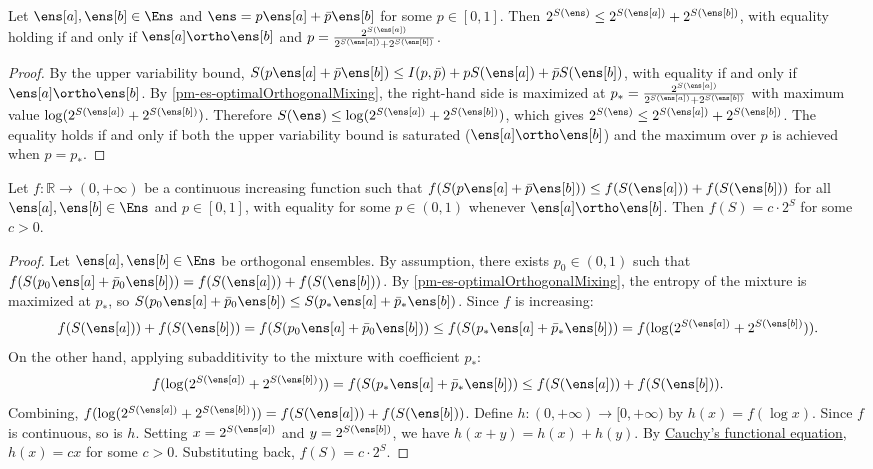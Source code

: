 \begin{mathSection}
	\begin{prop}\label{pm-es-exponentialEntropySubadditivity}
		Let $\ens[a], \ens[b] \in \Ens$ and $\ens = p\ens[a] + \bar{p}\ens[b]$ for some $p \in [0,1]$. Then $2^{S(\ens)} \leq 2^{S(\ens[a])} + 2^{S(\ens[b])}$, with equality holding if and only if $\ens[a] \ortho \ens[b]$ and $p = \frac{2^{S(\ens[a])}}{2^{S(\ens[a])}+2^{S(\ens[b])}}$.
	\end{prop}
	
	\begin{proof}
		By the upper variability bound, $S(p\ens[a]+\bar{p}\ens[b]) \leq I(p,\bar{p}) + pS(\ens[a]) + \bar{p}S(\ens[b])$, with equality if and only if $\ens[a] \ortho \ens[b]$. By \ref{pm-es-optimalOrthogonalMixing}, the right-hand side is maximized at $p_* = \frac{2^{S(\ens[a])}}{2^{S(\ens[a])}+2^{S(\ens[b])}}$ with maximum value $\log(2^{S(\ens[a])}+2^{S(\ens[b])})$. Therefore $S(\ens) \leq \log(2^{S(\ens[a])}+2^{S(\ens[b])})$, which gives $2^{S(\ens)} \leq 2^{S(\ens[a])}+2^{S(\ens[b])}$. The equality holds if and only if both the upper variability bound is saturated ($\ens[a] \ortho \ens[b]$) and the maximum over $p$ is achieved when $p = p_*$.
	\end{proof}
	
	\begin{prop}\label{pm-es-uniquenessExponentialEntropy}
		Let $f : \mathbb{R} \to (0,+\infty)$ be a continuous increasing function such that $f(S(p\ens[a]+\bar{p}\ens[b])) \leq f(S(\ens[a]))+f(S(\ens[b]))$ for all $\ens[a],\ens[b]\in\Ens$ and $p\in[0,1]$, with equality for some $p \in (0,1)$ whenever $\ens[a]\ortho\ens[b]$. Then $f(S)=c \cdot 2^S$ for some $c>0$.
	\end{prop}
	
	\begin{proof}
		Let $\ens[a],\ens[b]\in\Ens$ be orthogonal ensembles. By assumption, there exists $p_0\in(0,1)$ such that $f(S(p_0\ens[a]+\bar{p}_0\ens[b])) = f(S(\ens[a]))+f(S(\ens[b]))$. By \ref{pm-es-optimalOrthogonalMixing}, the entropy of the mixture is maximized at $p_*$, so $S(p_0\ens[a]+\bar{p}_0\ens[b]) \leq S(p_*\ens[a]+\bar{p}_*\ens[b])$. Since $f$ is increasing:
		\begin{equation}
			f(S(\ens[a]))+f(S(\ens[b])) = f(S(p_0\ens[a]+\bar{p}_0\ens[b])) \leq f(S(p_*\ens[a]+\bar{p}_*\ens[b])) = f(\log(2^{S(\ens[a])}+2^{S(\ens[b])})).
		\end{equation}
		On the other hand, applying subadditivity to the mixture with coefficient $p_*$:
		\begin{equation}
			f(\log(2^{S(\ens[a])}+2^{S(\ens[b])})) = f(S(p_*\ens[a]+\bar{p}_*\ens[b])) \leq f(S(\ens[a]))+f(S(\ens[b])).
		\end{equation}
		Combining, $f(\log(2^{S(\ens[a])}+2^{S(\ens[b])})) = f(S(\ens[a]))+f(S(\ens[b]))$. Define $h:(0,+\infty)\to[0,+\infty)$ by $h(x)=f(\log x)$. Since $f$ is continuous, so is $h$. Setting $x=2^{S(\ens[a])}$ and $y=2^{S(\ens[b])}$, we have $h(x+y)=h(x)+h(y)$. By \href{https://en.wikipedia.org/wiki/Cauchy%27s_functional_equation}{Cauchy's functional equation}, $h(x)=cx$ for some $c>0$. Substituting back, $f(S)=c \cdot 2^S$.
	\end{proof}


\end{mathSection}
